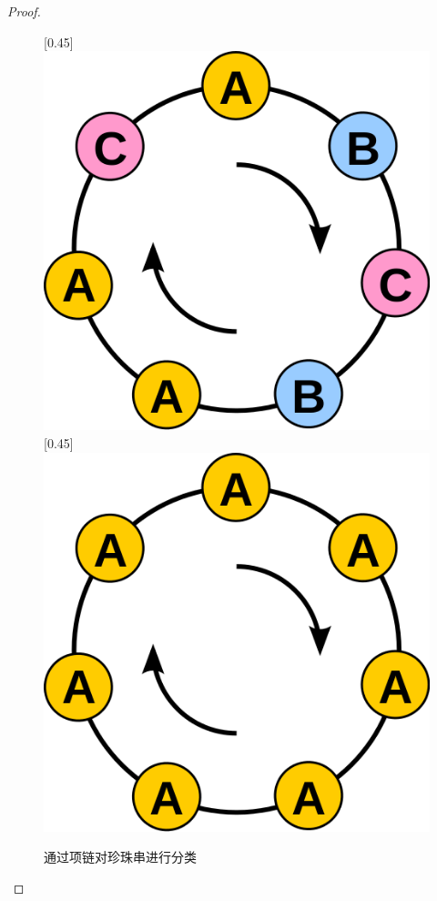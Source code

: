 \documentclass[b5paper]{ctexart}
\begin{document}
\begin{proof}
\begin{figure}[htbp]
  \centering
  [0.45\linewidth]{\includegraphics[scale=0.2]{img/bracelet-rotate.png}} \quad
  [0.45\linewidth]{\includegraphics[scale=0.2]{img/bracelet-identical.png}}
  \caption{通过项链对珍珠串进行分类}
  \label{fig:bracelet}
\end{figure}


\end{proof}
\end{document}
